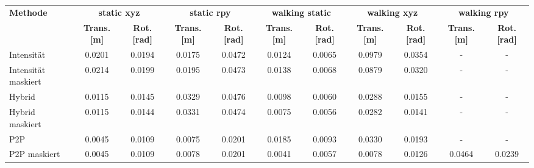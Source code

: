 \begin{tabular}{l*{10}{c}}
\toprule
    \multirow{2}{*}{\textbf{Methode}} & \multicolumn{2}{c}{\textbf{static xyz}} & \multicolumn{2}{c}{\textbf{static rpy}} & \multicolumn{2}{c}{\textbf{walking static}} & \multicolumn{2}{c}{\textbf{walking xyz}} & \multicolumn{2}{c}{\textbf{walking rpy}} \\
\cmidrule(lr){2-3}  \cmidrule(lr){4-5}  \cmidrule(lr){6-7}  \cmidrule(lr){8-9}  \cmidrule(lr){10-11}
    & \textbf{Trans. [m]} & \textbf{Rot. [rad]} & \textbf{Trans. [m]} & \textbf{Rot. [rad]} & \textbf{Trans. [m]} & \textbf{Rot. [rad]} & \textbf{Trans. [m]} & \textbf{Rot. [rad]} & \textbf{Trans. [m]} & \textbf{Rot. [rad]} \\
\midrule
Intensität  & 0.0201 & 0.0194 & 0.0175 & 0.0472 & 0.0124 & 0.0065 & 0.0979 & 0.0354 & - & - \\
Intensität maskiert & 0.0214 & 0.0199 & 0.0195 & 0.0473 & 0.0138 & 0.0068 & 0.0879 & 0.0320 & - & - \\
Hybrid  & 0.0115 & 0.0145 & 0.0329 & 0.0476 & 0.0098 & 0.0060 & 0.0288 & 0.0155 & - & - \\
Hybrid maskiert & 0.0115 & 0.0144 & 0.0331 & 0.0474 & 0.0075 & 0.0056 & 0.0282 & 0.0141 & - & - \\
P2P  & 0.0045 & 0.0109 & 0.0075 & 0.0201 & 0.0185 & 0.0093 & 0.0330 & 0.0193 & - & - \\
P2P maskiert & 0.0045 & 0.0109 & 0.0078 & 0.0201 & 0.0041 & 0.0057 & 0.0078 & 0.0126 & 0.0464 & 0.0239 \\
\bottomrule
\end{tabular}
